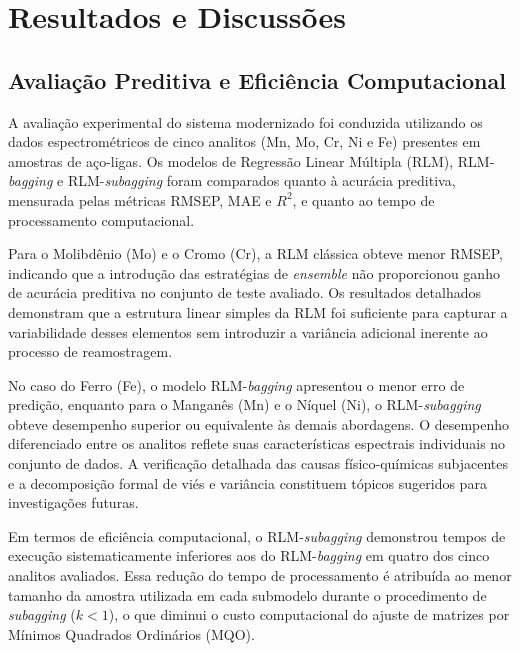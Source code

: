 \chapter{Resultados e Discussões}
\label{sec:resultados}

\section{Avaliação Preditiva e Eficiência Computacional}

A avaliação experimental do sistema modernizado foi conduzida utilizando os dados espectrométricos de cinco analitos (Mn, Mo, Cr, Ni e Fe) presentes em amostras de aço-ligas. Os modelos de Regressão Linear Múltipla (RLM), RLM-\textit{bagging} e RLM-\textit{subagging} foram comparados quanto à acurácia preditiva, mensurada pelas métricas RMSEP, MAE e $R^2$, e quanto ao tempo de processamento computacional.

Para o Molibdênio (Mo) e o Cromo (Cr), a RLM clássica obteve menor RMSEP, indicando que a introdução das estratégias de \textit{ensemble} não proporcionou ganho de acurácia preditiva no conjunto de teste avaliado. Os resultados detalhados demonstram que a estrutura linear simples da RLM foi suficiente para capturar a variabilidade desses elementos sem introduzir a variância adicional inerente ao processo de reamostragem.

No caso do Ferro (Fe), o modelo RLM-\textit{bagging} apresentou o menor erro de predição, enquanto para o Manganês (Mn) e o Níquel (Ni), o RLM-\textit{subagging} obteve desempenho superior ou equivalente às demais abordagens. O desempenho diferenciado entre os analitos reflete suas características espectrais individuais no conjunto de dados. A verificação detalhada das causas físico-químicas subjacentes e a decomposição formal de viés e variância constituem tópicos sugeridos para investigações futuras.

Em termos de eficiência computacional, o RLM-\textit{subagging} demonstrou tempos de execução sistematicamente inferiores aos do RLM-\textit{bagging} em quatro dos cinco analitos avaliados. Essa redução do tempo de processamento é atribuída ao menor tamanho da amostra utilizada em cada submodelo durante o procedimento de \textit{subagging} ($k < 1$), o que diminui o custo computacional do ajuste de matrizes por Mínimos Quadrados Ordinários (MQO).